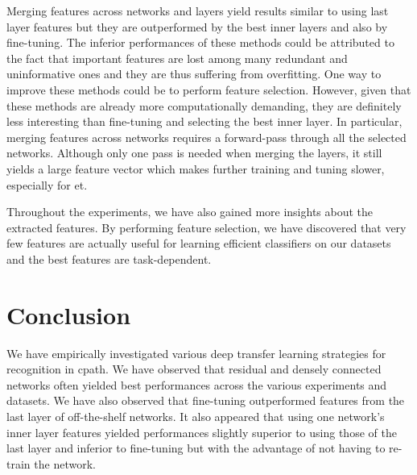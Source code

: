 Merging features across networks and layers yield results similar to using last layer features but they are outperformed by the best inner layers and also by fine-tuning. The inferior performances of these methods could be attributed to the fact that important features are lost among many redundant and uninformative ones and they are thus suffering from overfitting. One way to improve these methods could be to perform feature selection. However, given that these methods are already more computationally demanding, they are definitely less interesting than fine-tuning and selecting the best inner layer. In particular, merging features across networks requires a forward-pass through all the selected networks. Although only one pass is needed when merging the layers, it still yields a large feature vector which makes further training and tuning slower, especially for \acrshort{et}.

Throughout the experiments, we have also gained more insights about the extracted features. By performing feature selection, we have discovered that very few features are actually useful for learning efficient classifiers on our datasets and the best features are task-dependent.


\section{Conclusion}
\label{sec:comp:conclusion}

We have empirically investigated various deep transfer learning strategies for recognition in \acrlong{cpath}. We have observed that residual and densely connected networks often yielded best performances across the various experiments and datasets. We have also observed that fine-tuning outperformed features from the last layer of off-the-shelf networks. It also appeared that using one network's inner layer features yielded performances slightly superior to using those of the last layer and inferior to fine-tuning but with the advantage of not having to re-train the network. 


